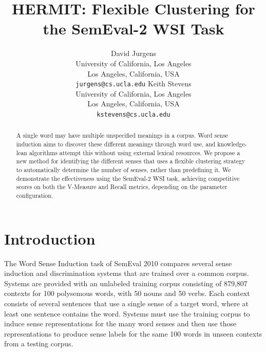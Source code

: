 \documentclass[11pt,a4]{article}
\begin{document}
\author{David Jurgens\\
  University of California, Los Angeles\\
  Los Angeles, California, USA\\
  {\tt jurgens@cs.ucla.edu} \And
  Keith Stevens \\
  University of California, Los Angeles\\
  Los Angeles, California, USA\\
  {\tt kstevens@cs.ucla.edu}}

\title{
  HERMIT: Flexible Clustering for the SemEval-2 WSI Task}

\date{}

\maketitle

\begin{abstract}

A single word may have multiple unspecified meanings in a corpus.  Word sense
induction aims to discover these different meanings through word use, and
knowledge-lean algorithms attempt this without using external lexical resources.
We propose a new method for identifying the different senses that uses a
flexible clustering strategy to automatically determine the number of senses,
rather than predefining it.  We demonstrate the effectiveness using the
SemEval-2 WSI task, achieving competitive scores on both the V-Measure and
Recall metrics, depending on the parameter configuration.

\end{abstract}
  
\section{Introduction}

The Word Sense Induction task of SemEval 2010 compares several sense induction
and discrimination systems that are trained over a common corpus.  Systems are
provided with an unlabeled training corpus consisting of 879,807 contexts for
100 polysemous words, with 50 nouns and 50 verbs.  Each context
consists of several sentences that use a single sense of a target word, where at
least one sentence contains the word.  Systems must use the training corpus to
induce sense representations for the many word senses 
and then use those representations to produce sense labels for the same 100
words in unseen contexts from a testing corpus.
\end{document}

